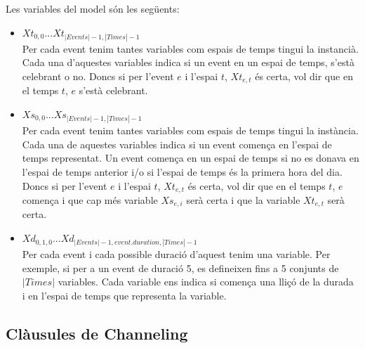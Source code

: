 \documentclass[11pt,a4paper,twoside]{report}
\begin{document}
  Les variables del model són les següents:
  \begin{itemize}
    \item $Xt_{0,0} . . . Xt_{|Events|-1,|Times|-1}$\\Per cada event tenim tantes variables com espais de temps tingui la instancià. Cada una d'aquestes variables indica si un event en un espai de temps, s'està celebrant o no. 
    Doncs si per l'event $e$ i l'espai $t$, $Xt_{e,t}$ és certa, vol dir que en el temps $t$, $e$ s'està celebrant.
    \item $Xs_{0,0} . . . Xs_{|Events|-1,|Times|-1}$\\Per cada event tenim tantes variables com espais de temps tingui la instància. Cada una de aquestes variables indica si un event comença en l'espai de temps representat. Un event comença en un espai de temps si no es donava en l'espai de temps anterior i/o si l'espai de temps és la primera hora del dia.
    Doncs si per l'event $e$ i l'espai $t$, $Xt_{e,t}$ és certa, vol dir que en el temps $t$, $e$ comença i que cap més variable $Xs_{e,i}$ serà certa i que la variable $Xt_{e,t}$ serà certa.
    \item $Xd_{0,1,0} . . . Xd_{|Events|-1, event.duration, |Times|-1}$\\ Per cada event i cada possible duració d'aquest tenim una variable. Per exemple, si per a un event de duració 5, es defineixen fins a 5 conjunts de $|Times|$ variables. 
    Cada variable ens indica si comença una lliçó de la durada i en l'espai de temps que representa la variable. 
  \end{itemize}

  \subsection{Clàusules de Channeling}
\end{document}
